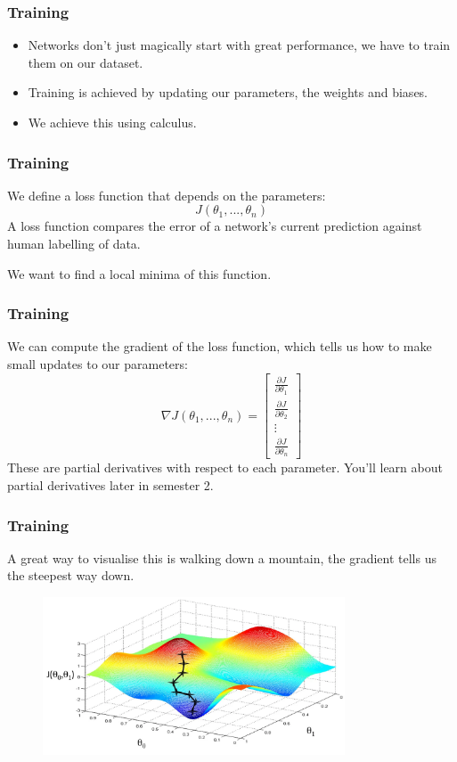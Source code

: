 \documentclass{beamer}
\begin{document}
\begin{frame}
    \frametitle{Training}
    \begin{itemize}
        \item Networks don't just magically start with great performance, we have to \alert{train} them on our dataset. \pause
        \item \alert{Training} is achieved by updating our \alert{parameters}, the weights and biases. \pause
        \item We achieve this using \alert{calculus}.
    \end{itemize}
\end{frame}

\begin{frame}
    \frametitle{Training}
    We define a \alert{loss function} that depends on the parameters:
    \[J(\theta_1,... , \theta_n)\]
    A loss function compares the error of a network's current prediction against human labelling of data.
    \vspace{0.5cm}

    We want to find a local minima of this function.
\end{frame}

\begin{frame}
    \frametitle{Training}
    We can compute the \alert{gradient} of the loss function, which tells us how to make small updates to our parameters:
    \[\nabla J(\theta_1,... , \theta_n) = \begin{bmatrix}
            \frac{\partial J}{\partial \theta_1} \\[6pt]
            \frac{\partial J}{\partial \theta_2} \\[6pt]
            \vdots                               \\[6pt]
            \frac{\partial J}{\partial \theta_n}
        \end{bmatrix}\]
    These are partial derivatives with respect to each parameter. You'll learn about partial derivatives later in semester 2.
\end{frame}

\begin{frame}
    \frametitle{Training}
    A great way to visualise this is walking down a mountain, the gradient tells us the steepest way down.
    \begin{figure}
        \centering
        \includegraphics[width=0.8\textwidth]{images/gradient-descent.png}
    \end{figure}
\end{frame}
\end{document}
